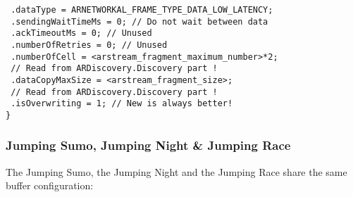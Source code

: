 \begin{itemize}
{    \texttt{  .dataType = ARNETWORKAL\_FRAME\_TYPE\_DATA\_LOW\_LATENCY;}\\
    \texttt{  .sendingWaitTimeMs = 0; // Do not wait between data}\\
    \texttt{  .ackTimeoutMs = 0; // Unused}\\
    \texttt{  .numberOfRetries = 0; // Unused}\\
    \texttt{  .numberOfCell = <arstream\_fragment\_maximum\_number>*2;}\\
    \texttt{                  // Read from ARDiscovery.Discovery part !}\\
    \texttt{  .dataCopyMaxSize = <arstream\_fragment\_size>;}\\
    \texttt{                     // Read from ARDiscovery.Discovery part !}\\
    \texttt{  .isOverwriting = 1; // New is always better!}\\
    \texttt{\}}
}
\end{itemize}

\newpage

\subsubsection{Jumping Sumo, Jumping Night \& Jumping Race}

The Jumping Sumo, the Jumping Night and the Jumping Race share the same buffer configuration:

